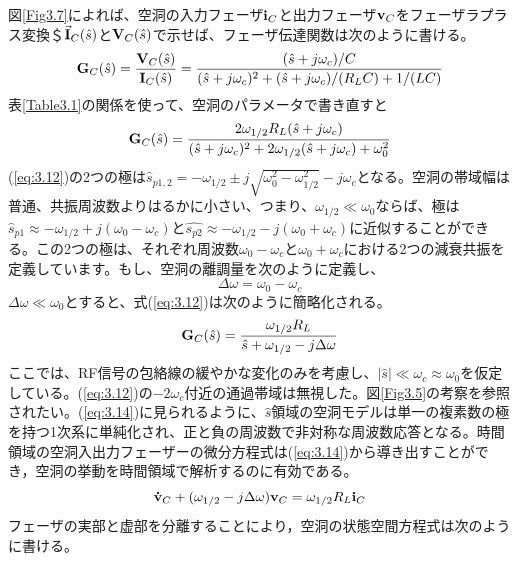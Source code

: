 \documentclass[book]{jlreq}
\begin{document}
図\ref{Fig3.7}によれば、空洞の入力フェーザ$\vb{i}_C$と出力フェーザ$\vb{v}_C$をフェーザラプラス変換＄$\va{I}_C(\hat{s})$と$\vb{V}_C(\hat{s})$で示せば、フェーザ伝達関数は次のように書ける。
%
\begin{equation}
    \vb{G}_C(\hat{s}) = \frac{\vb{V}_C(\hat{s})}{\vb{I}_C(\hat{s})} 
    = \frac{(\hat{s}+j\omega_c)/C}{(\hat{s}+j\omega_c)^2+(\hat{s}+j\omega_c)/(R_L C)+1/(LC)} \notag
\end{equation}
%
表\ref{Table3.1}の関係を使って、空洞のパラメータで書き直すと
%
\begin{equation}
    \vb{G}_C(\hat{s}) = \frac{2\omega_{1/2} R_L (\hat{s}+j\omega_c)}{(\hat{s}+j\omega_c)^2+2\omega_{1/2}(\hat{s}+j\omega_c)+\omega_0^2}
    \label{eq:3.12}
\end{equation}
%
(\ref{eq:3.12})の2つの極は$\hat{s}_{p1,2} = -\omega_{1/2} \pm j\sqrt{\omega_0^2-\omega_{1/2}^2} - j\omega_c$となる。空洞の帯域幅は普通、共振周波数よりはるかに小さい、つまり、$\omega_{1/2} \ll \omega_0$ならば、極は$\hat{s}_{p1}\approx -\omega_{1/2}+j(\omega_0 - \omega_c)$と$\hat{s_{p2}}\approx -\omega_{1/2}-j(\omega_0 + \omega_c)$に近似することができる。この2つの極は、それぞれ周波数$\omega_0-\omega_c$と$\omega_0 + \omega_c$における2つの減衰共振を定義しています。もし、空洞の離調量を次のように定義し、 
%
\begin{equation}
    \Delta\omega = \omega_0 - \omega_c
    \label{eq:3.13}
\end{equation}
%
$\Delta\omega \ll \omega_0$とすると、式(\ref{eq:3.12})は次のように簡略化される。
%
\begin{equation}
    \vb{G}_C(\hat{s}) = \frac{\omega_{1/2}R_L}{\hat{s}+\omega_{1/2}-j\Delta\omega}
    \label{eq:3.14}
\end{equation}
%
ここでは、RF信号の包絡線の緩やかな変化のみを考慮し、$|\hat{s}| \ll \omega_c \approx \omega_0$を仮定している。(\ref{eq:3.12})の$-2\omega_c$付近の通過帯域は無視した。図\ref{Fig3.5}の考察を参照されたい。(\ref{eq:3.14})に見られるように、$\hat{s}$領域の空洞モデルは単一の複素数の極を持つ1次系に単純化され、正と負の周波数で非対称な周波数応答となる。時間領域の空洞入出力フェーザーの微分方程式は(\ref{eq:3.14})から導き出すことができ，空洞の挙動を時間領域で解析するのに有効である。
%
\begin{equation}
    \vb{\dot{v}}_C + (\omega_{1/2} - j\Delta\omega)\vb{v}_C = \omega_{1/2}R_L\vb{i}_C
    \label{eq:3.15}
\end{equation}
%
フェーザの実部と虚部を分離することにより，空洞の状態空間方程式は次のように書ける。
%
\end{document}
